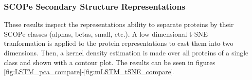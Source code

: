\documentclass[a4paper,12pt]{article}
\begin{document}
\subsubsection{SCOPe Secondary Structure Representations}
\label{section:SCOPe}
These results inspect the representations ability to separate proteins by their SCOPe classes (alphas, betas, small, etc.). A low dimensional t-SNE tranformation is applied to the protein representations to cast them into two dimensions. Then, a kernel density estimation is made over all proteins of a single class and shown with a contour plot. The results can be seen in figures \ref{fig:LSTM_pca_compare}-\ref{fig:mLSTM_tSNE_compare}.
\end{document}
